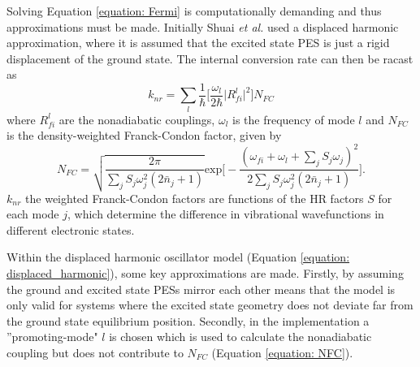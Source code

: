 Solving Equation \ref{equation: Fermi} is computationally demanding and thus approximations must be made. Initially Shuai \textit{et al.} used a displaced harmonic approximation, where it is assumed that the excited state \ac{PES} is just a rigid displacement of the ground state.\cite{Yui2005} The internal conversion rate can then be racast as
\begin{equation} \label{equation: displaced_harmonic}
    k_{nr}=\sum_{l}\frac{1}{\hbar}\bigg[\frac{\omega_{l}}{2\hbar{}}\big|R_{fi}^{l}\big|^{2}\bigg]N_{FC}
\end{equation}
where $R^{l}_{fi}$ are the nonadiabatic couplings, $\omega_{l}$ is the frequency of mode $l$ and $N_{FC}$ is the density-weighted Franck-Condon factor, given by
\begin{equation}\label{equation: NFC}
N_{FC}=\sqrt{\frac{2\pi}{\sum_{j}S_{j}\omega^{2}_{j}(2\bar{n}_{j}+1)}}\mathrm{exp}\bigg[-\frac{(\omega_{fi}+\omega_{l}+\sum_{j}S_{j}\omega_{j})^{2}}{2\sum_{j}S_{j}\omega_{j}^{2}(2\bar{n}_{j}+1)}\bigg].
\end{equation}
$k_{nr}$ the weighted Franck-Condon factors are functions of the \ac{HR} factors $S$ for each mode $j$, which determine the difference in vibrational wavefunctions in different electronic states. 

Within the displaced harmonic oscillator model (Equation \ref{equation: displaced_harmonic}), some key approximations are made. Firstly, by assuming the ground and excited state \acp{PES} mirror each other means that the model is only valid for systems where the excited state geometry does not deviate far from the ground state equilibrium position. Secondly, in the implementation a ''promoting-mode" $l$ is chosen which is used to calculate the nonadiabatic coupling but does not contribute to $N_{FC}$ (Equation \ref{equation: NFC}). 

